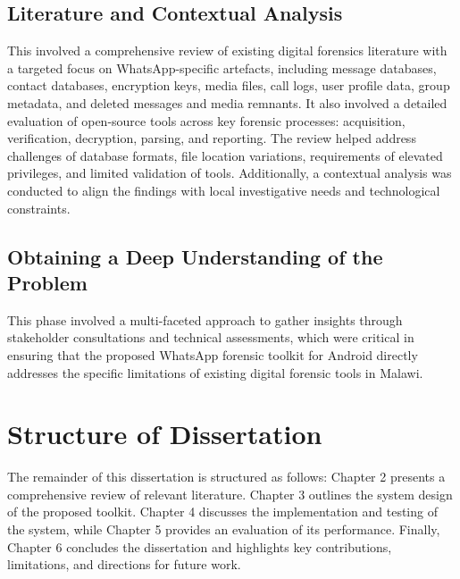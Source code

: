 \documentclass[12pt,a4paper]{report}
\begin{document}
\subsection{Literature and Contextual Analysis}

This involved a comprehensive review of existing digital forensics literature with a targeted focus on WhatsApp-specific artefacts, including message databases, contact databases, encryption keys, media files, call logs, user profile data, group metadata, and deleted messages and media remnants. It also involved a detailed evaluation of open-source tools across key forensic processes: acquisition, verification, decryption, parsing, and reporting. The review helped address challenges of database formats, file location variations, requirements of elevated privileges, and limited validation of tools. Additionally, a contextual analysis was conducted to align the findings with local investigative needs and technological constraints.

\subsection{Obtaining a Deep Understanding of the Problem}

This phase involved a multi-faceted approach to gather insights through stakeholder consultations and technical assessments, which were critical in ensuring that the proposed WhatsApp forensic toolkit for Android directly addresses the specific limitations of existing digital forensic tools in Malawi.

\section{Structure of Dissertation}

The remainder of this dissertation is structured as follows: Chapter 2 presents a comprehensive review of relevant literature. Chapter 3 outlines the system design of the proposed toolkit. Chapter 4 discusses the implementation and testing of the system, while Chapter 5 provides an evaluation of its performance. Finally, Chapter 6 concludes the dissertation and highlights key contributions, limitations, and directions for future work.

\end{document}

